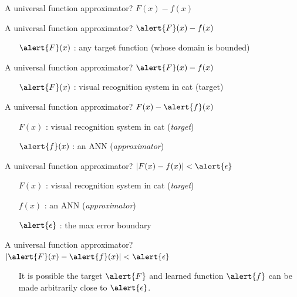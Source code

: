 \documentclass[10pt]{beamer}
\begin{document}
\begin{frame}[fragile]{A universal function approximator?}
$F(x) - f(x)$
\end{frame}

\begin{frame}[fragile]{A universal function approximator?}
$\alert{F}(x) - f(x)$
\begin{itemize}
    \item[$\alert{F}(x)$] : any target function (whose domain is bounded)
\end{itemize}
\end{frame}

\begin{frame}[fragile]{A universal function approximator?}
$\alert{F}(x) - f(x)$
\begin{itemize}
    \item[$\alert{F}(x)$] : visual recognition system in cat (target)
\end{itemize}
\end{frame}

\begin{frame}[fragile]{A universal function approximator?}
$F(x) - \alert{f}(x)$ 
\begin{itemize}
\item[$F(x)$] : visual recognition system in cat (\textit{target})\\
\item[$\alert{f}(x)$] : an ANN (\textit{approximator})
\end{itemize}
\end{frame}

\begin{frame}[fragile]{A universal function approximator?}
$|F(x) - f(x)| < \alert{\epsilon}$ 
\begin{itemize}
\item[$F(x)$] : visual recognition system in cat (\textit{target})\\
\item[$f(x)$] : an ANN (\textit{approximator})
\item[$\alert{\epsilon}$] : the max error boundary
\end{itemize}
\end{frame}

\begin{frame}[fragile]{A universal function approximator?}
$|\alert{F}(x) - \alert{f}(x)| < \alert{\epsilon}$ 
\begin{itemize}
\item[] It is possible the target $\alert{F}$ and learned function $\alert{f}$ can be made arbitrarily close to $\alert{\epsilon}$.
\end{itemize}
\end{frame}
\end{document}
